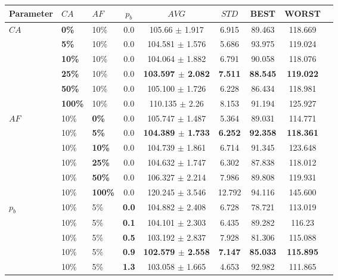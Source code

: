 \begin{table}
    \centering
    \begin{tabular}{|l|l|l|c||c|c|c|c|c|}
    \hline
    Parameter & $CA$ & $AF$ & $p_b$ & $AVG$ & $STD$ &BEST & WORST \\
    \hline
    $CA$ & \textbf{0\%} & 10\% & 0.0 & 105.66 $\pm$ 1.917 & 6.915 & 89.463 & 118.669\\
    ~ & \textbf{5\%} & 10\% & 0.0 & 104.581 $\pm$ 1.576 & 5.686 & 93.975 & 119.024\\
    ~ & \textbf{10\%} & 10\% & 0.0 & 104.064 $\pm$ 1.882 & 6.791 & 90.058 & 118.076\\
    ~ & \textbf{25\%} & 10\% & 0.0 & \textbf{103.597 $\pm$ 2.082} & \textbf{7.511} & \textbf{88.545} & \textbf{119.022}\\
    ~ & \textbf{50\%} & 10\% & 0.0 & 105.100 $\pm$ 1.726 & 6.228 & 86.434 & 118.981\\
    ~ & \textbf{100\%} & 10\% & 0.0 & 110.135 $\pm$ 2.26 & 8.153 & 91.194 & 125.927\\
    \hline
    $AF$ & 10\% & \textbf{0\%} & 0.0 & 105.747 $\pm$ 1.487 & 5.364& 89.031 & 114.771\\
    ~ & 10\% & \textbf{5\%} & 0.0 & \textbf{104.389 $\pm$ 1.733} & \textbf{6.252}& \textbf{92.358} & \textbf{118.361}\\
    ~ & 10\% & \textbf{10\%} & 0.0 & 104.739 $\pm$ 1.861 & 6.714 & 91.345 & 123.648\\
    ~ & 10\% & \textbf{25\%} & 0.0 & 104.632 $\pm$ 1.747 & 6.302 & 87.838 & 118.012\\
    ~ & 10\% & \textbf{50\%} & 0.0 & 106.327 $\pm$ 2.214 & 7.986 & 89.808 & 119.931\\
    ~ & 10\% & \textbf{100\%} & 0.0 & 120.245 $\pm$ 3.546 & 12.792 & 94.116 & 145.600\\
    \hline
    $p_b$ & 10\% & 5\% & \textbf{0.0} & 104.882 $\pm$ 2.408 & 6.728 & 78.721 & 113.019\\
    ~ & 10\% & 5\% & \textbf{0.1} & 104.101 $\pm$ 2.303 & 6.435 &89.282 & 116.23\\
    ~ & 10\% & 5\% & \textbf{0.5} & 103.192 $\pm$ 2.837 & 7.928 & 81.306 & 115.088\\
    ~ & 10\% & 5\% & \textbf{0.9} & \textbf{102.579 $\pm$ 2.558} & \textbf{7.147} & \textbf{85.033} & \textbf{115.895}\\
    ~ & 10\% & 5\% & \textbf{1.3} & 103.058 $\pm$ 1.665 & 4.653 & 92.982 & 111.865\\

\end{tabular}
\end{table}
